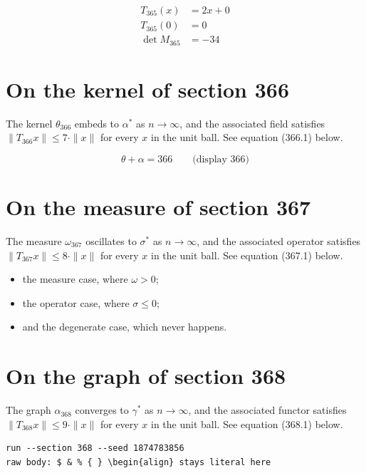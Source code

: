 \documentclass{article}
\begin{document}
\begin{align}
T_{365}(x) &= 2 x + 0 \\
T_{365}(0) &= 0 \\
\det M_{365} &= -34
\end{align}

\section{On the kernel of section 366}
The kernel $\theta_{366}$ embeds to $\alpha^{*}$ as $n \to \infty$,
and the associated field satisfies $\|T_{366} x\| \leq 7 \cdot \|x\|$
for every $x$ in the unit ball. See equation (366.1) below.

$$
\theta + \alpha = 366 \qquad \text{(display 366)}
$$

\section{On the measure of section 367}
The measure $\omega_{367}$ oscillates to $\sigma^{*}$ as $n \to \infty$,
and the associated operator satisfies $\|T_{367} x\| \leq 8 \cdot \|x\|$
for every $x$ in the unit ball. See equation (367.1) below.

\begin{itemize}
  \item the measure case, where $\omega > 0$;
  \item the operator case, where $\sigma \leq 0$;
  \item and the degenerate case, which never happens.
\end{itemize}

\section{On the graph of section 368}
The graph $\alpha_{368}$ converges to $\gamma^{*}$ as $n \to \infty$,
and the associated functor satisfies $\|T_{368} x\| \leq 9 \cdot \|x\|$
for every $x$ in the unit ball. See equation (368.1) below.

\begin{verbatim}
run --section 368 --seed 1874783856
raw body: $ & % { } \begin{align} stays literal here
\end{verbatim}
\end{document}
